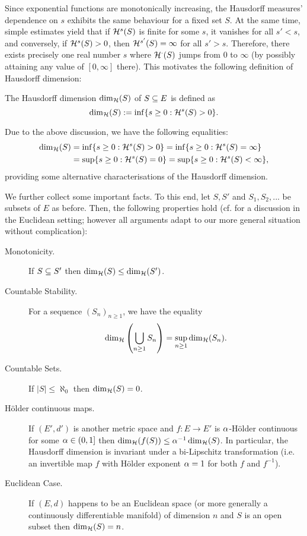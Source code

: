 Since exponential functions are monotonically increasing, the Hausdorff measures' dependence on $s$ exhibits the same behaviour for a fixed set $S$. At the same time, simple estimates yield that if $\mathcal{H}^s(S)$ is finite for some $s$, it vanishes for all $s'<s$, and conversely, if $\mathcal{H}^s(S)>0$, then $\mathcal{H}^{s'}(S)=\infty$ for all $s'>s$. Therefore, there exists precisely one real number $s$ where $\mathcal{H}^\cdot(S)$ jumps from $0$ to $\infty$ (by possibly attaining any value of $[0,\infty]$ there). This motivates the following definition of Hausdorff dimension:
\begin{defin}
  The Hausdorff dimension $\dim_{\mathcal{H}}(S)$ of $S\subseteq E$ is defined as
  \[
    \dim_{\mathcal{H}}(S):=\inf\{s\geq0:\mathcal{H}^s(S)>0\}.
  \]
\end{defin}
Due to the above discussion, we have the following equalities:
\begin{align*}
   \dim_{\mathcal{H}}(S)&=\inf\{s\geq0:\mathcal{H}^s(S)>0\}=\inf\{s\geq0:\mathcal{H}^s(S)=\infty\}\\
           &=\sup\{s\geq0:\mathcal{H}^s(S)=0\}=\sup\{s\geq0:\mathcal{H}^s(S)<\infty\},
\end{align*}
providing some alternative characterisations of the Hausdorff dimension.

We further collect some important facts. To this end, let $S,S'$ and $S_1,S_2,...$ be subsets of $E$ as before. Then, the following properties hold (cf. \cite[p.32f]{falconer2007fractal} for a discussion in the Euclidean setting; however all arguments adapt to our more general situation without complication):
\begin{description}
  \item[Monotonicity.] If $S\subseteq S'$ then $\dim_{\mathcal{H}}(S)\leq\dim_{\mathcal{H}}(S')$. 
  \item[Countable Stability.] For a sequence $(S_n)_{n\geq1}$, we have the equality
  \[ 
    \dim_{\mathcal{H}}\left(\bigcup_{n\geq1}S_n\right)=\sup_{n\geq1} \dim_{\mathcal{H}}(S_n).
  \]
  \item[Countable Sets.] If $|S|\leq\aleph_0$ then $\dim_{\mathcal{H}}(S)=0$.
  \item[H\"older continuous maps.] If $(E',d')$ is another metric space and $f:E\to E'$ is $\alpha$-H\"older continuous for some $\alpha\in(0,1]$ then $\dim_{\mathcal{H}}(f(S))\leq \alpha^{-1}\dim_{\mathcal{H}}(S)$. In particular, the Hausdorff dimension is invariant under a bi-Lipschitz transformation (i.e. an invertible map $f$ with H\"older exponent $\alpha=1$ for both $f$ and $f^{-1}$).
  \item[Euclidean Case.] If $(E,d)$ happens to be an Euclidean space (or more generally a continuously differentiable manifold) of dimension $n$ and $S$ is an open subset then $\dim_{\mathcal{H}}(S)=n$.
\end{description}

